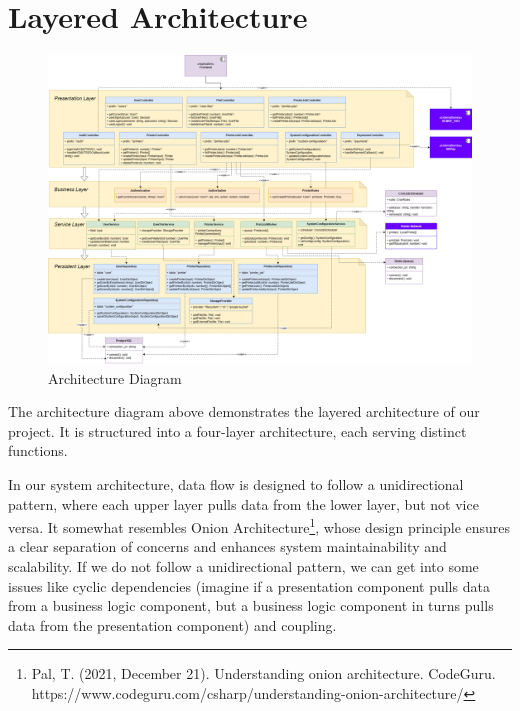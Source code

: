 \section{Layered Architecture}

\begin{figure}[H]
  \includegraphics[max height=0.9\linewidth, angle=90,origin=c]{chapters/6. architecture-design/Architecture Diagram.drawio.png}
  \caption{Architecture Diagram}%
\end{figure}

The architecture diagram above demonstrates the layered architecture of our project. It is structured into a four-layer architecture, each serving distinct functions.

In our system architecture, data flow is designed to follow a unidirectional pattern, where each upper layer pulls data from the lower layer, but not vice versa. It somewhat resembles Onion Architecture\footnote{Pal, T. (2021, December 21). Understanding onion architecture. CodeGuru. https://www.codeguru.com/csharp/understanding-onion-architecture/}, whose design principle ensures a clear separation of concerns and enhances system maintainability and scalability. If we do not follow a unidirectional pattern, we can get into some issues like cyclic dependencies (imagine if a presentation component pulls data from a business logic component, but a business logic component in turns pulls data from the presentation component) and coupling.

